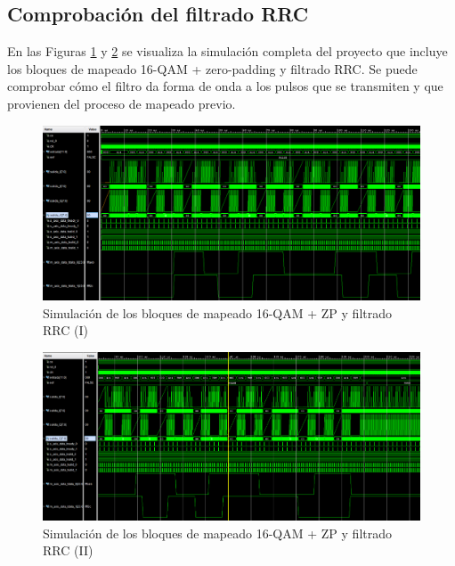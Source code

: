\pagebreak

\subsection{Comprobación del filtrado RRC}

En las Figuras \ref{fig:rrc1} y \ref{fig:rrc2} se visualiza la simulación completa del proyecto que incluye los bloques de mapeado 16-QAM + zero-padding y filtrado RRC. Se puede comprobar cómo el filtro da forma de onda a los pulsos que se transmiten y que provienen del proceso de mapeado previo.

\begin{figure}[h]
	\centering
	\includegraphics[width=1\textwidth]{img/simu/rrc.PNG}
	\caption{Simulación de los bloques de mapeado 16-QAM + ZP y filtrado RRC (I)}
	\label{fig:rrc1}
\end{figure}

\vspace{3mm}

\begin{figure}[h]
	\centering
	\includegraphics[width=1\textwidth]{img/simu/rrc2.PNG}
	\caption{Simulación de los bloques de mapeado 16-QAM + ZP y filtrado RRC (II)}
	\label{fig:rrc2}
\end{figure}

\vspace{3mm}